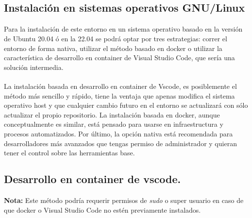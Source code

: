 \subsection{Instalación en sistemas operativos GNU/Linux}

\paragraph{}Para la instalación de este entorno en un sistema operativo basado en
la versión de Ubuntu 20.04 ó en la 22.04 se podrá optar por tres estrategias: correr
el entorno de forma nativa, utilizar el método basado en docker o utilizar la característica
de desarrollo en container de Visual Studio Code, que sería una solución intermedia.

\paragraph{}La instalación basada en desarrollo en container de Vscode, es posiblemente
el método más sencillo y rápido, tiene la ventaja que apenas modifica el sistema operativo
host y que cualquier cambio futuro en el entorno se actualizará con sólo actualizar el
propio repositorio. La instalación basada en docker, aunque conceptualmente es similar,
está pensado para usarse en infraestructura y procesos automatizados. Por último, la opción
nativa está recomendada para desarrolladores más avanzados que tengas permiso de administrador
y quieran tener el control sobre las herramientas base.

\subsection{Desarrollo en container de vscode.}

\paragraph{}\textbf{Nota:} Este método podría requerir permisos de \emph{sudo} o super
usuario en caso de que docker o Visual Studio Code no estén previamente instalados.

